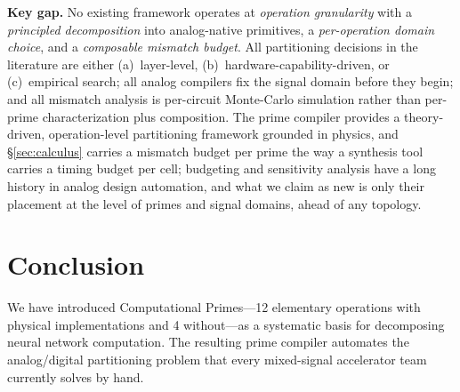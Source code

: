 \documentclass[11pt]{article}
\begin{document}
\textbf{Key gap.} No existing framework operates at \textit{operation granularity} with a \textit{principled decomposition} into analog-native primitives, a \textit{per-operation domain choice}, and a \textit{composable mismatch budget}. All partitioning decisions in the literature are either (a)~layer-level, (b)~hardware-capability-driven, or (c)~empirical search; all analog compilers fix the signal domain before they begin; and all mismatch analysis is per-circuit Monte-Carlo simulation rather than per-prime characterization plus composition. The prime compiler provides a theory-driven, operation-level partitioning framework grounded in physics, and \S\ref{sec:calculus} carries a mismatch budget per prime the way a synthesis tool carries a timing budget per cell; budgeting and sensitivity analysis have a long history in analog design automation, and what we claim as new is only their placement at the level of primes and signal domains, ahead of any topology.

\section{Conclusion}

We have introduced Computational Primes---12 elementary operations with physical implementations and 4 without---as a systematic basis for decomposing neural network computation. The resulting prime compiler automates the analog/digital partitioning problem that every mixed-signal accelerator team currently solves by hand.
\end{document}

